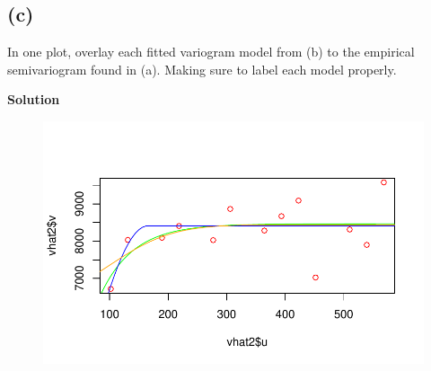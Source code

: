 \documentclass[
  letterpaper,
  DIV=11,
  numbers=noendperiod]{scrartcl}
\newenvironment{Shaded}{\begin{snugshade}}{\end{snugshade}}
\newcommand{\AttributeTok}[1]{\textcolor[rgb]{0.40,0.45,0.13}{#1}}
\newcommand{\FunctionTok}[1]{\textcolor[rgb]{0.28,0.35,0.67}{#1}}
\newcommand{\NormalTok}[1]{\textcolor[rgb]{0.00,0.23,0.31}{#1}}
\newcommand{\SpecialCharTok}[1]{\textcolor[rgb]{0.37,0.37,0.37}{#1}}
\newcommand{\StringTok}[1]{\textcolor[rgb]{0.13,0.47,0.30}{#1}}
\begin{document}
\hypertarget{c-1}{%
\subsection{(c)}\label{c-1}}

In one plot, overlay each fitted variogram model from (b) to the
empirical semivariogram found in (a). Making sure to label each model
properly.

\textbf{Solution}

\begin{Shaded}
\end{Shaded}

\begin{figure}[H]

{\centering \includegraphics{geo-hw-spdep_files/figure-pdf/unnamed-chunk-8-1.pdf}

}

\end{figure}
\end{document}
